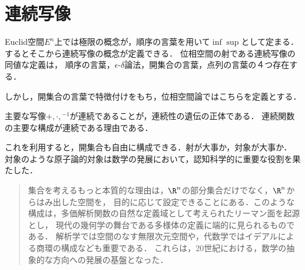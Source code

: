 \documentclass[uplatex,dvipdfmx]{jsreport}
\begin{document}
\section{連続写像}

\begin{screen}
    Euclid空間$E^n$上では極限の概念が，順序の言葉を用いて$\inf\sup$として定まる．
    するとそこから連続写像の概念が定義できる．
    位相空間の射である連続写像の同値な定義は，
    順序の言葉，$\epsilon$-$\delta$論法，開集合の言葉，点列の言葉の４つ存在する．

    しかし，開集合の言葉で特徴付けをもち，位相空間論ではこちらを定義とする．

    主要な写像$+,\cdot,{}^{-1}$が連続であることが，連続性の遺伝の正体である．
    連続関数の主要な構成が連続である理由である．

    これを利用すると，開集合も自由に構成できる．射が大事か，対象が大事か．
    対象のような原子論的対象は数学の発展において，認知科学的に重要な役割を果たした．
    \begin{quotation}
        集合を考えるもっと本質的な理由は，$\R^n$の部分集合だけでなく，$\R^n$からはみ出した空間を，
        目的に応じて設定できることにある．このような構成は，多価解析関数の自然な定義域として考えられたリーマン面を起源とし，
        現代の幾何学の舞台である多様体の定義に端的に見られるものである．
        解析学では空間のなす無限次元空間や，代数学ではイデアルによる商環の構成なども重要である．
        これらは，20世紀における，数学の抽象的な方向への発展の基盤となった．
    \end{quotation}
\end{screen}
\end{document}
